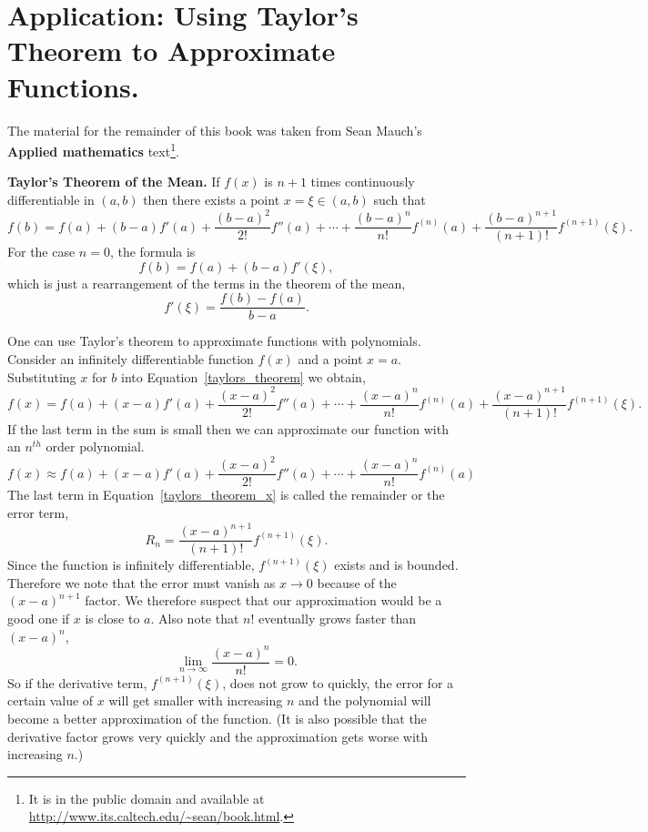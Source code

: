 
\section{Application: Using Taylor's Theorem to Approximate Functions.}

The material for the remainder of this book was taken from Sean Mauch's 
{\bf Applied mathematics} text\footnote{It is in the public domain and available at
\url{http://www.its.caltech.edu/~sean/book.html}.}.


\begin{theorem}
{\bf Taylor's Theorem of the Mean.}
{\rm
If $f(x)$ is $n+1$ times continuously differentiable in $(a,b)$ then there
exists a point $x = \xi \in (a,b)$ such that
\begin{equation}
  \label{taylors_theorem}
  f(b) = f(a) + (b-a) f'(a) + \frac{(b-a)^2}{2!} f''(a) + \cdots + 
  \frac{(b-a)^n}{n!} f^{(n)}(a) 
  + \frac{(b-a)^{n+1}}{(n+1)!} f^{(n+1)}(\xi).
\end{equation}
For the case $n = 0$, the formula is
\[
f(b) = f(a) + (b-a) f'(\xi),
\]
which is just a rearrangement of the terms in the theorem of the mean,
\[
f'(\xi) = \frac{f(b) - f(a)}{b-a}.
\]
}
\end{theorem}



One can use Taylor's theorem to approximate functions with polynomials.
Consider an infinitely differentiable function $f(x)$ and a point $x = a$.  
Substituting $x$ for $b$ into Equation~\ref{taylors_theorem} we obtain,
\[
\label{taylors_theorem_x}
f(x) = f(a) + (x-a) f'(a) + \frac{(x-a)^2}{2!} f''(a) + \cdots + 
\frac{(x-a)^n}{n!} f^{(n)}(a) 
+ \frac{(x-a)^{n+1}}{(n+1)!} f^{(n+1)}(\xi).
\]
If the last term in the sum is small then we can approximate our function
with an $n^{th}$ order polynomial.
\[
f(x) \approx f(a) + (x-a) f'(a) + \frac{(x-a)^2}{2!} f''(a) + \cdots + 
\frac{(x-a)^n}{n!} f^{(n)}(a) 
\]
The last term in Equation~\ref{taylors_theorem_x} is called the remainder
or the error term,
\[
R_n = \frac{(x-a)^{n+1}}{(n+1)!} f^{(n+1)}(\xi).
\]
Since the function is infinitely differentiable, $f^{(n+1)}(\xi)$ exists and
is bounded.  Therefore we note that the error must vanish as $x \to 0$ 
because of the $(x-a)^{n+1}$ factor.  We therefore suspect that our 
approximation would be a good one if $x$ is close to $a$.  Also note that
$n!$ eventually grows faster than $(x-a)^n$,
\[
\lim_{n \to \infty} \frac{(x-a)^n}{n!} = 0.
\]
So if the derivative term, $f^{(n+1)}(\xi)$, does not grow to quickly, the
error for a certain value of $x$ will get smaller with increasing $n$ and
the polynomial will become a better approximation of the function.
(It is also possible that the derivative factor grows very quickly and 
the approximation gets worse with increasing $n$.)




